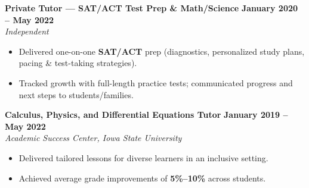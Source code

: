 \documentclass[10pt]{article}
\begin{document}
	\textbf{Private Tutor --- SAT/ACT Test Prep \& Math/Science} \hfill \textbf{January 2020 -- May 2022} \\
	\emph{Independent}
	\begin{itemize}
		\item Delivered one-on-one \textbf{SAT/ACT} prep (diagnostics, personalized study plans, pacing \& test-taking strategies).
		\item Tracked growth with full-length practice tests; communicated progress and next steps to students/families.
	\end{itemize}
	
	\textbf{Calculus, Physics, and Differential Equations Tutor} \hfill \textbf{January 2019 -- May 2022} \\
	\emph{Academic Success Center, Iowa State University}
	\begin{itemize}
		\item Delivered tailored lessons for diverse learners in an inclusive setting.
		\item Achieved average grade improvements of \textbf{5\%--10\%} across students.
	\end{itemize}
	
\end{document}
